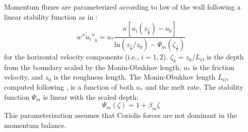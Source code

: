 \documentclass[draft]{agujournal2019}
\begin{document}
Momentum fluxes are parameterized according to law of the wall following a linear stability function as in :
%
\begin{equation} \label{eq:tau}
    \overline{w''u_i''}_b = u_* \frac{ \kappa \left[u_i\left(z_{\frac{1}{2}}\right) - u_b \right]}{\textrm{ln}\left(z_{\frac{1}{2}}/z_0\right)-\Psi_m\left(\zeta_{\frac{1}{2}}\right)}
\end{equation}
%
for the horizontal velocity components (i.e., $i=1,2$). $\zeta_k = z_k/L_O$ is the depth from the boundary scaled by the Monin-Obukhov length, $u_*$ is the friction velocity, and $z_0$ is the roughness length. The Monin-Obukhov length $L_O$, computed following , is a function of both $u_*$ and the melt rate. The stability function $\Psi_m$ is linear with the scaled depth:
\begin{equation}\label{eq:psi}
    \Psi_m(\zeta) = 1 + \beta_m \zeta
\end{equation}
This parameterization assumes that Coriolis forces are not dominant in the momentum balance.
\end{document}
